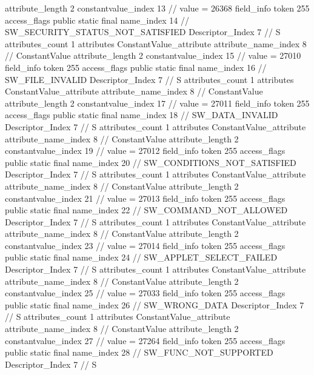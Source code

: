 {{{{{{{					attribute_length	2
					constantvalue_index	13		// value = 26368
				}
				}
			}
			field_info {
				token	255
				access_flags	public static final
				name_index	14		// SW_SECURITY_STATUS_NOT_SATISFIED
				Descriptor_Index	7		// S
				attributes_count	1
				attributes {
				ConstantValue_attribute {
					attribute_name_index	8		// ConstantValue
					attribute_length	2
					constantvalue_index	15		// value = 27010
				}
				}
			}
			field_info {
				token	255
				access_flags	public static final
				name_index	16		// SW_FILE_INVALID
				Descriptor_Index	7		// S
				attributes_count	1
				attributes {
				ConstantValue_attribute {
					attribute_name_index	8		// ConstantValue
					attribute_length	2
					constantvalue_index	17		// value = 27011
				}
				}
			}
			field_info {
				token	255
				access_flags	public static final
				name_index	18		// SW_DATA_INVALID
				Descriptor_Index	7		// S
				attributes_count	1
				attributes {
				ConstantValue_attribute {
					attribute_name_index	8		// ConstantValue
					attribute_length	2
					constantvalue_index	19		// value = 27012
				}
				}
			}
			field_info {
				token	255
				access_flags	public static final
				name_index	20		// SW_CONDITIONS_NOT_SATISFIED
				Descriptor_Index	7		// S
				attributes_count	1
				attributes {
				ConstantValue_attribute {
					attribute_name_index	8		// ConstantValue
					attribute_length	2
					constantvalue_index	21		// value = 27013
				}
				}
			}
			field_info {
				token	255
				access_flags	public static final
				name_index	22		// SW_COMMAND_NOT_ALLOWED
				Descriptor_Index	7		// S
				attributes_count	1
				attributes {
				ConstantValue_attribute {
					attribute_name_index	8		// ConstantValue
					attribute_length	2
					constantvalue_index	23		// value = 27014
				}
				}
			}
			field_info {
				token	255
				access_flags	public static final
				name_index	24		// SW_APPLET_SELECT_FAILED
				Descriptor_Index	7		// S
				attributes_count	1
				attributes {
				ConstantValue_attribute {
					attribute_name_index	8		// ConstantValue
					attribute_length	2
					constantvalue_index	25		// value = 27033
				}
				}
			}
			field_info {
				token	255
				access_flags	public static final
				name_index	26		// SW_WRONG_DATA
				Descriptor_Index	7		// S
				attributes_count	1
				attributes {
				ConstantValue_attribute {
					attribute_name_index	8		// ConstantValue
					attribute_length	2
					constantvalue_index	27		// value = 27264
				}
				}
			}
			field_info {
				token	255
				access_flags	public static final
				name_index	28		// SW_FUNC_NOT_SUPPORTED
				Descriptor_Index	7		// S
}}}}}
